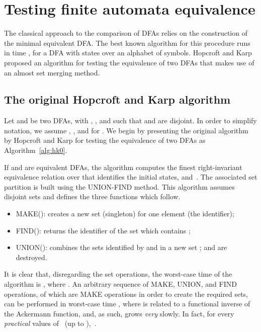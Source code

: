 \documentclass[copyright]{eptcs}
\newcommand{\dfa}{DFA\xspace}
\newcommand{\dfas}{DFAs\xspace}
\begin{document}
\section{Testing finite automata equivalence}
\label{sec:dfa}

The classical approach to the comparison of \dfas relies on the
construction of the minimal equivalent \dfa. The best known algorithm
for this procedure runs in  time \cite{hopcroft71_c},
for a \dfa with  states over an alphabet of  symbols.
Hopcroft and Karp~\cite{hopcroft71_c:_linear_algor_for_testin_equiv}
proposed an algorithm for testing the equivalence of two \dfas that
makes use of an almost  set merging method.

\subsection{The original Hopcroft and Karp algorithm}
\label{subsec:original}
Let  and  be two \dfas, with , , and such
that  and  are 
disjoint.
In order to simplify notation, we assume , , and  for .
We begin by presenting the original algorithm by Hopcroft and Karp
\cite{aho74:_desig_analy_comput_algor} for testing the equivalence of
two \dfas as Algorithm~\ref{alg:hk0}.

If  and  are equivalent \dfas, the algorithm computes the finest
right-invariant equivalence relation over  that identifies the
initial states,  and~. The associated set partition is built
using the UNION-FIND method. This algorithm assumes disjoint sets and
defines the three functions which follow.
\begin{itemize}
\item MAKE(): creates a new set (singleton) for one element 
  (the identifier);
\item FIND(): returns the identifier  of the set which contains ;
\item UNION(): combines the sets identified by  and  in
  a new set \hbox{};  and  are destroyed.
\end{itemize}

It is clear that, disregarding the set operations, the worst-case time
of the algorithm is , where
. 
An arbitrary sequence of  MAKE, UNION, and FIND operations,  of
which are MAKE operations in order to create the required sets, can be
performed in worst-case time , where  is
related to a functional inverse of the Ackermann function, and, as
such, grows \emph{very} slowly. In fact, for every \emph{practical}
values of ~(up to ),~. 
\end{document}
